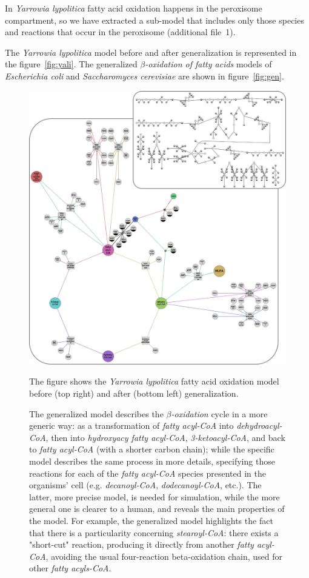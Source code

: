 \documentclass[10pt]{bmc_article}
\newenvironment{bmcformat}{\baselineskip20pt\sloppy\setboolean{publ}{false}}{\baselineskip20pt\sloppy}
\begin{document}
\begin{bmcformat}
In \textit{Yarrowia lypolitica} fatty acid oxidation happens in the peroxisome compartment, so we have extracted a sub-model that includes only those species and reactions that occur in the peroxisome (additional file~1). 

The \textit{Yarrowia lypolitica} model before and after generalization is represented in the figure~\ref{fig:yali}.
The generalized \textit{$\beta$-oxidation of fatty acids} models of \textit{Escherichia coli} and \textit{Saccharomyces cerevisiae} are shown in figure~\ref{fig:gen}.
 
\begin{figure}  
\includegraphics[scale=1]{pics/yali.png} 

      The figure shows the \textit{Yarrowia lypolitica} fatty acid oxidation model before (top right) and after (bottom left) generalization. 
      
      The generalized model describes the \textit{$\beta$-oxidation} cycle in a more generic way: as a transformation of \textit{fatty acyl-CoA} into \textit{dehydroacyl-CoA}, then into \textit{hydroxyacy fatty acyl-CoA}, \textit{3-ketoacyl-CoA}, and back to \textit{fatty acyl-CoA} (with a shorter carbon chain); while the specific model describes the same process in more details, specifying those reactions for each of the \textit{fatty acyl-CoA} species presented in the organisms' cell (e.g. \textit{decanoyl-CoA}, \textit{dodecanoyl-CoA}, etc.). The latter, more precise model, is needed for simulation, while the more general one is clearer to a human, and reveals the main properties of the model. For example, the generalized model highlights the fact that there is a particularity concerning \textit{stearoyl-CoA}: there exists a "short-cut" reaction, producing it directly from another \textit{fatty acyl-CoA}, avoiding the usual four-reaction beta-oxidation chain, used for other \textit{fatty acyls-CoA}.
      

\end{figure}
\end{bmcformat}
\end{document}
